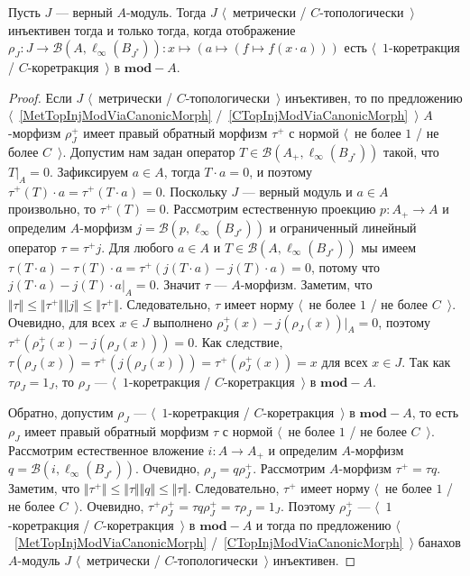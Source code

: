 \begin{proposition}\label{NonDegenMetTopInjCharac}  Пусть $J$ --- верный
$A$-модуль. Тогда $J$ $\langle$~метрически / $C$-топологически~$\rangle$
инъективен тогда и только тогда, когда отображение
$\rho_J:J\to\mathcal{B}(A,\ell_\infty(B_{J^*})):x\mapsto(a\mapsto(f\mapsto
f(x\cdot a)))$ есть $\langle$~$1$-коретракция / $C$-коретракция~$\rangle$ в
$\mathbf{mod}-A$.
\end{proposition} 
\begin{proof}
Если $J$ $\langle$~метрически / $C$-топологически~$\rangle$ инъективен, то по
предложению $\langle$~\ref{MetTopInjModViaCanonicMorph}
/~\ref{CTopInjModViaCanonicMorph}~$\rangle$ $A$-морфизм $\rho_J^+$ имеет правый
обратный морфизм $\tau^+$ с нормой $\langle$~не более $1$ / не более
$C$~$\rangle$. Допустим нам задан оператор $T\in
\mathcal{B}(A_+,\ell_\infty(B_{J^*}))$ такой, что $T|_A=0$. Зафиксируем $a\in
A$, тогда $T\cdot a=0$, и поэтому $\tau^+(T)\cdot a=\tau^+(T\cdot a)=0$.
Поскольку $J$ --- верный модуль и $a\in A$ произвольно, то $\tau^+(T)=0$.
Рассмотрим естественную проекцию $p:A_+\to A$ и определим $A$-морфизм
$j=\mathcal{B}(p,\ell_\infty(B_{J^*}))$ и ограниченный линейный оператор
$\tau=\tau^+ j$. Для любого $a\in A$ и $T\in\mathcal{B}(A,\ell_\infty(B_{J^*}))$
мы имеем $\tau(T\cdot a)-\tau(T)\cdot a=\tau^+(j(T\cdot a)-j(T)\cdot a)=0$,
потому что $j(T\cdot a)-j(T)\cdot a|_A=0$. Значит $\tau$ --- $A$-морфизм.
Заметим, что $\Vert\tau\Vert\leq\Vert\tau^+\Vert\Vert j\Vert\leq
\Vert\tau^+\Vert$. Следовательно, $\tau$ имеет норму $\langle$~не более $1$ / не
более $C$~$\rangle$. Очевидно, для всех $x\in J$ выполнено
$\rho_J^+(x)-j(\rho_J(x))|_A=0$, поэтому $\tau^+(\rho_J^+(x)-j(\rho_J(x)))=0$.
Как следствие, $\tau(\rho_J(x))=\tau^+(j(\rho_J(x)))=\tau^+(\rho_J^+(x))=x$ для
всех $x\in J$. Так как $\tau\rho_J=1_J$, то $\rho_J$ ---
$\langle$~$1$-коретракция / $C$-коретракция~$\rangle$ в $\mathbf{mod}-A$.

Обратно, допустим $\rho_J$ --- $\langle$~$1$-коретракция /
$C$-коретракция~$\rangle$ в $\mathbf{mod}-A$, то есть $\rho_J$ имеет правый
обратный морфизм $\tau$ с нормой $\langle$~не более $1$ / не более
$C$~$\rangle$. Рассмотрим естественное вложение $i:A\to A_+$ и определим
$A$-морфизм $q=\mathcal{B}(i,\ell_\infty(B_{J^*}))$. Очевидно,
$\rho_J=q\rho_J^+$. Рассмотрим $A$-морфизм $\tau^+=\tau q$. Заметим, что
$\Vert\tau^+\Vert\leq\Vert\tau\Vert\Vert q\Vert\leq \Vert\tau\Vert$.
Следовательно, $\tau^+$ имеет норму $\langle$~не более $1$ / не более
$C$~$\rangle$. Очевидно, $\tau^+\rho_J^+=\tau q\rho_J^+=\tau\rho_J=1_J$. Поэтому
$\rho_J^+$ --- $\langle$~$1$-коретракция / $C$-коретракция~$\rangle$ в
$\mathbf{mod}-A$ и тогда по предложению
$\langle$~\ref{MetTopInjModViaCanonicMorph}
/~\ref{CTopInjModViaCanonicMorph}~$\rangle$ банахов $A$-модуль $J$
$\langle$~метрически / $C$-топологически~$\rangle$ инъективен.
\end{proof}

